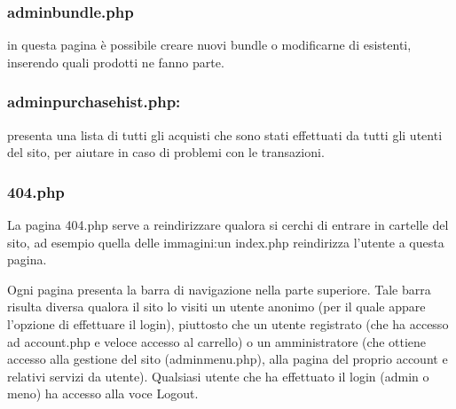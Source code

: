\subsubsection{adminbundle.php}\Spazio in questa pagina è possibile creare nuovi bundle o modificarne di esistenti, inserendo quali prodotti ne fanno parte.

\subsubsection{adminpurchasehist.php:} \Spazio presenta una lista di tutti gli acquisti che sono stati effettuati da tutti gli utenti del sito, per aiutare in caso di problemi con le transazioni.

\subsubsection{404.php} \Spazio
La pagina 404.php serve a reindirizzare qualora si cerchi di entrare in cartelle del sito, ad esempio quella delle immagini:un index.php reindirizza l'utente a questa pagina.


Ogni pagina presenta la barra di navigazione nella parte superiore. Tale barra risulta diversa qualora il sito lo visiti un utente anonimo (per il quale appare l'opzione di effettuare il login), piuttosto che un utente registrato (che ha accesso ad account.php e veloce accesso al carrello) o un amministratore (che ottiene accesso alla gestione del sito (adminmenu.php), alla pagina del proprio account e relativi servizi da utente). Qualsiasi utente che ha effettuato il login (admin o meno) ha accesso alla voce Logout.

